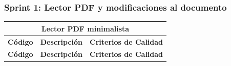 
\subsubsection{Sprint 1: Lector PDF y modificaciones al documento}

\begin{longtable}{|l||p{7cm}|p{4.5cm}|}

\multicolumn{3}{c}{Lector PDF minimalista}\\
\hline
\textbf{Código} & \textbf{Descripción} & \textbf{Criterios de Calidad}\\
\hline\hline
\endfirsthead
\hline
\textbf{Código} & \textbf{Descripción} & \textbf{Criterios de Calidad}\\
\hline\hline
\endhead


\end{longtable}
